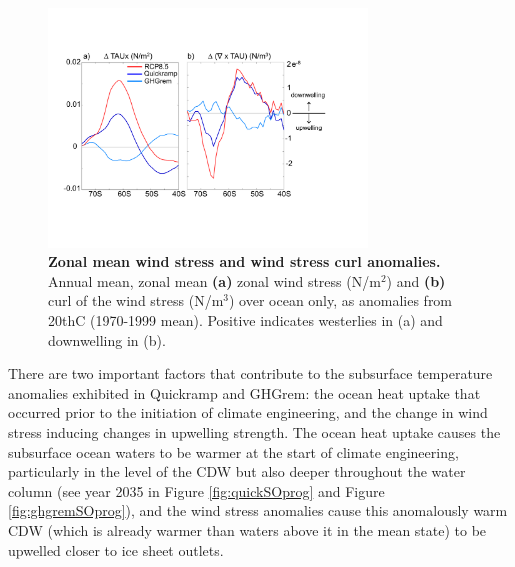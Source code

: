 \documentclass[grl]{AGUTeX}  %
\begin{document}
\begin{article}
\begin{figure}[htbp] %
\centering
 \noindent\includegraphics[width=20pc]{figures/zmTAU2.pdf}
\caption{\textbf{Zonal mean wind stress and wind stress curl anomalies.} Annual mean, zonal mean \textbf{(a)} zonal wind stress (N/m$^2$) and \textbf{(b)} curl of the wind stress (N/m$^3$) over ocean only, as anomalies from 20thC (1970-1999 mean). Positive indicates westerlies in (a) and downwelling in (b).}
\label{fig:zmtau}
\end{figure}

There are two important factors that contribute to the subsurface temperature anomalies exhibited in Quickramp and GHGrem: the ocean heat uptake that occurred prior to the initiation of climate engineering, and the change in wind stress inducing changes in upwelling strength. The ocean heat uptake causes the subsurface ocean waters to be warmer at the start of climate engineering, particularly in the level of the CDW but also deeper throughout the water column (see year 2035 in Figure \ref{fig:quickSOprog} and Figure \ref{fig:ghgremSOprog}), and the wind stress anomalies cause this anomalously warm CDW (which is already warmer than waters above it in the mean state) to be upwelled closer to ice sheet outlets. 


\end{article}
\end{document}
